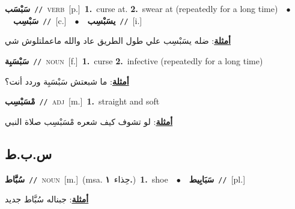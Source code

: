 \documentclass[10pt,a4paper,twoside]{article} %
\begin{document}
\begin{multicols}{2}
{\setlength\topsep{0pt}\textbf{\foreignlanguage{arabic}{سَبْسَب}}\ {\color{gray}\texttt{//}\color{black}}\ \textsc{verb}\ [p.]\ \textbf{1.}~curse at.  \textbf{2.}~swear at (repeatedly for a long time)\ \ $\bullet$\ \ \setlength\topsep{0pt}\textbf{\foreignlanguage{arabic}{سَبْسِب}}\ {\color{gray}\texttt{//}\color{black}}\ [c.]\ \ $\bullet$\ \ \setlength\topsep{0pt}\textbf{\foreignlanguage{arabic}{يسَبْسِب}}\ {\color{gray}\texttt{//}\color{black}}\ [i.]\  \begin{flushright}\color{gray}\foreignlanguage{arabic}{\textbf{\underline{\foreignlanguage{arabic}{أمثلة}}}: ضله يسَبْسِب علي طول الطريق عاد والله ماعملتلوش شي}\end{flushright}\color{black}} \vspace{2mm}

{\setlength\topsep{0pt}\textbf{\foreignlanguage{arabic}{سَبْسَبِة}}\ {\color{gray}\texttt{//}\color{black}}\ \textsc{noun}\ [f.]\ \textbf{1.}~curse  \textbf{2.}~infective (repeatedly for a long time)\  \begin{flushright}\color{gray}\foreignlanguage{arabic}{\textbf{\underline{\foreignlanguage{arabic}{أمثلة}}}: ما شبعتش سَبْسَبِة وردد أنت؟}\end{flushright}\color{black}} \vspace{2mm}

{\setlength\topsep{0pt}\textbf{\foreignlanguage{arabic}{مْسَبْسِب}}\ {\color{gray}\texttt{//}\color{black}}\ \textsc{adj}\ [m.]\ \textbf{1.}~straight and soft\  \begin{flushright}\color{gray}\foreignlanguage{arabic}{\textbf{\underline{\foreignlanguage{arabic}{أمثلة}}}: لو تشوف كيف شعره مْسَبْسِب صلاة النبي}\end{flushright}\color{black}} \vspace{2mm}

\vspace{-3mm}
\subsection*{\color{blue}\foreignlanguage{arabic}{س.ب.ط}\color{blue}{}} 

{\setlength\topsep{0pt}\textbf{\foreignlanguage{arabic}{سُبََّاط}}\ {\color{gray}\texttt{//}\color{black}}\ \textsc{noun}\ [m.]\ \color{gray}(msa. \foreignlanguage{arabic}{حِذاء}~\foreignlanguage{arabic}{\textbf{١.}})\color{black}\ \textbf{1.}~shoe\ \ $\bullet$\ \ \setlength\topsep{0pt}\textbf{\foreignlanguage{arabic}{سَبَابِيط}}\ {\color{gray}\texttt{//}\color{black}}\ [pl.]\  \begin{flushright}\color{gray}\foreignlanguage{arabic}{\textbf{\underline{\foreignlanguage{arabic}{أمثلة}}}: جبناله سُبَّاط جديد}\end{flushright}\color{black}} \vspace{2mm}


\end{multicols}
\end{document}

